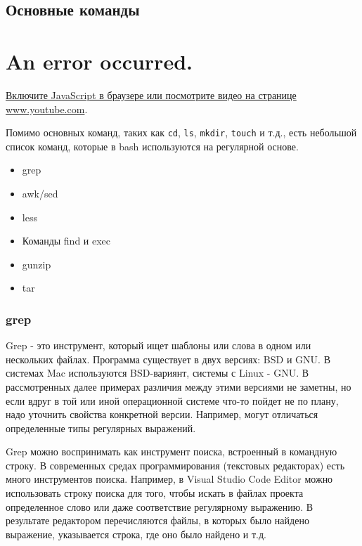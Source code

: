 \documentclass{report}
\begin{document}
\hypertarget{Common-Commands}{%
\subsection{\texorpdfstring{\protect\hyperlink{Common-Commands}{}Основные
команды}{Основные команды}}\label{Common-Commands}}

\hypertarget{player}{}

\hypertarget{an-error-occurred.}{%
\section{An error occurred.}\label{an-error-occurred.}}

\href{https://www.youtube.com/watch?v=yCTnihfbPCo}{Включите JavaScript в
браузере или посмотрите видео на странице www.youtube.com}.

Помимо основных команд, таких как \texttt{cd}, \texttt{ls},
\texttt{mkdir}, \texttt{touch} и т.д., есть небольшой список команд,
которые в bash используются на регулярной основе.

\begin{itemize}
\tightlist
\item
  grep
\item
  awk/sed
\item
  less
\item
  Команды find и exec
\item
  gunzip
\item
  tar
\end{itemize}

\hypertarget{grep}{%
\subsubsection{\texorpdfstring{\protect\hyperlink{grep}{}grep}{grep}}\label{grep}}

Grep - это инструмент, который ищет шаблоны или слова в одном или
нескольких файлах. Программа существует в двух версиях: BSD и GNU. В
системах Mac используются BSD-вариянт, системы с Linux - GNU. В
рассмотренных далее примерах различия между этими версиями не заметны,
но если вдруг в той или иной операционной системе что-то пойдет не по
плану, надо уточнить свойства конкретной версии. Например, могут
отличаться определенные типы регулярных выражений.

Grep можно воспринимать как инструмент поиска, встроенный в командную
строку. В современных средах программирования (текстовых редакторах)
есть много инструментов поиска. Например, в Visual Studio Code Editor
можно использовать строку поиска для того, чтобы искать в файлах проекта
определенное слово или даже соответствие регулярному выражению. В
результате редактором перечисляются файлы, в которых было найдено
выражение, указывается строка, где оно было найдено и т.д.
\end{document}

